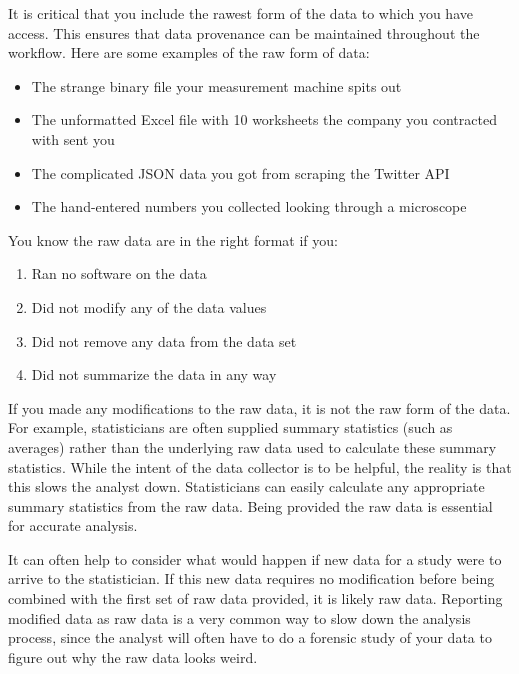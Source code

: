 \documentclass[12pt]{article}
\providecommand{\tightlist}{%
  \setlength{\itemsep}{0pt}\setlength{\parskip}{0pt}}
\begin{document}
It is critical that you include the rawest form of the data to which you
have access. This ensures that data provenance can be maintained
throughout the workflow. Here are some examples of the raw form of data:

\begin{itemize}
\tightlist
\item
  The strange binary file \citep{_binary_2017} your measurement machine
  spits out
\item
  The unformatted Excel file with 10 worksheets the company you
  contracted with sent you
\item
  The complicated JSON \citep{noauthor_json:_nodate} data you got from
  scraping the Twitter API \citep{noauthor_twitter_nodate}
\item
  The hand-entered numbers you collected looking through a microscope
\end{itemize}

You know the raw data are in the right format if you:

\begin{enumerate}
\def\labelenumi{\arabic{enumi}.}
\tightlist
\item
  Ran no software on the data
\item
  Did not modify any of the data values
\item
  Did not remove any data from the data set
\item
  Did not summarize the data in any way
\end{enumerate}

If you made any modifications to the raw data, it is not the raw form of
the data. For example, statisticians are often supplied summary
statistics (such as averages) rather than the underlying raw data used
to calculate these summary statistics. While the intent of the data
collector is to be helpful, the reality is that this slows the analyst
down. Statisticians can easily calculate any appropriate summary
statistics from the raw data. Being provided the raw data is essential
for accurate analysis.

It can often help to consider what would happen if new data for a study
were to arrive to the statistician. If this new data requires no
modification before being combined with the first set of raw data
provided, it is likely raw data. Reporting modified data as raw data is
a very common way to slow down the analysis process, since the analyst
will often have to do a forensic study of your data to figure out why
the raw data looks weird.
\end{document}
